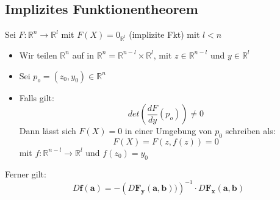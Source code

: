 \documentclass[8pt, a4paper, landscape, fleqn]{scrartcl}
\def\R{\mathbb{R}}
\def\d{\text{d}}
\begin{document}
\begin{multicols*}{3}
			\subsection{Implizites Funktionentheorem}
				\label{sec:impl}
			    Sei $F: \mathbb{R}^n \rightarrow \mathbb{R}^l$ mit $F(X) = 0_{\mathbb{R}^l}$ (implizite Fkt) mit $l<n$
			    \begin{itemize}
			        \item[1)] Wir teilen $\mathbb{R}^n$ auf in $\mathbb{R}^n = \mathbb{R}^{n-l}\times \mathbb{R}^l$, mit $z\in \mathbb{R}^{n-l}$ und $y \in \mathbb{R}^l$
			        \item[2)] Sei $p_o = (z_0, y_0) \in \mathbb{R}^n$
			        \item[3)] Falls gilt: \[det(\frac{dF}{dy}(p_o)) \neq 0\]
			        Dann lässt sich $F(X) = 0$ in einer Umgebung von $p_0$ schreiben als:
			        \[F(X) = F(z, f(z)) = 0\]
			        mit $f:\mathbb{R}^{n-l}\rightarrow\mathbb{R}^l$ und $f(z_0) = y_0$
			    \end{itemize}
			    Ferner gilt:
				\[D\textbf{f}(\textbf{a})=-\left(D\textbf{F}_{\textbf{y}}(\textbf{a}, \textbf{b}))\right)^{-1}\cdot D\textbf{F}_{\textbf{x}}(\textbf{a}, \textbf{b})\]

\end{multicols*}
\end{document}
